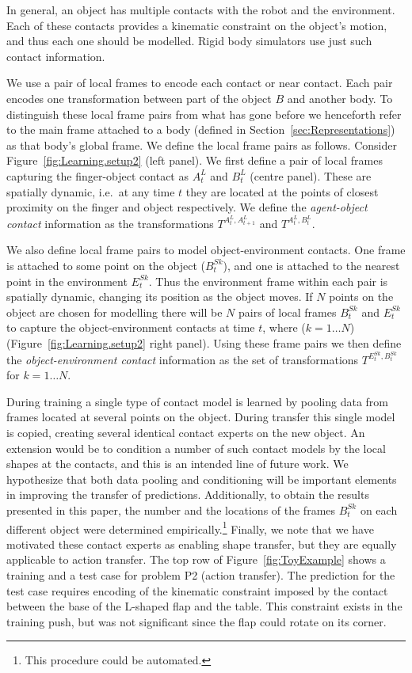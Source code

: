In general, an object has multiple contacts with the robot and the environment. Each of these contacts provides a kinematic constraint on the object's motion, and thus each one should be modelled. Rigid body simulators use just such contact information. 

We use a pair of local frames to encode each contact or near contact. Each pair encodes one transformation between part of the object $B$ and another body.  To distinguish these local frame pairs from what has gone before we henceforth refer to the main frame attached to a body (defined in Section~\ref{sec:Representations}) as that body's global frame. We define the local frame pairs as follows. Consider Figure~\ref{fig:Learning.setup2}  (left panel). We first define a pair of local frames capturing the finger-object contact as $A^{L}_{t}$ and $B^{L}_{t}$ (centre panel). These are spatially dynamic, i.e.\ at any time $t$ they are located at the points of closest proximity on the finger and object respectively.  We define the \textit{agent-object contact}
information as the transformations $T^{A^{L}_{t}, A^{L}_{t+1}}$ and $T^{A^{L}_t, B^{L}_t}$.

We also define local frame pairs to model object-environment contacts. One frame is attached to some point on the object ($B^{Sk}_t$), and one is attached to the nearest point in the environment $E^{Sk}_t$.  Thus the environment frame within each pair is spatially dynamic, changing its position as the object moves. If $N$ points on the object are chosen for modelling there will be $N$ pairs of local frames $B^{Sk}_t$ and $E^{Sk}_t$ to capture the object-environment contacts at time $t$, where ($k=1 \ldots N$) (Figure~\ref{fig:Learning.setup2} right panel). Using these frame pairs we then define the \textit{object-environment contact} information as the set of transformations $T^{E^{Sk}_t,B^{Sk}_t}$ for $k=1 \ldots N$. 

During training a single type of contact model is learned by pooling data from frames located at several points on the object. During transfer this single model is copied, creating several identical contact experts on the new object. An extension would be to condition a number of such contact models by the local shapes at the contacts, and this is an intended line of future work. We hypothesize that both data pooling and conditioning will be important elements in improving the transfer of predictions. Additionally, to obtain the results presented in this paper, the number and the locations of the frames $B^{Sk}_t$ on each different object were determined empirically.\footnote{This procedure could be automated.} Finally, we note that we have motivated these contact experts as enabling shape transfer, but they are equally applicable to action transfer. The top row of Figure~\ref{fig:ToyExample} shows a training and a test case for problem P2 (action transfer). The prediction for the test case requires encoding of the kinematic constraint imposed by the contact between the base of the L-shaped flap and the table. This constraint exists in the training push, but was not significant since the flap could rotate on its corner.

